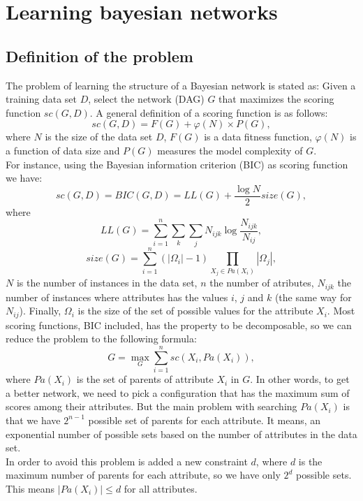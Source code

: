 \section{Learning bayesian networks}
\label{sec:learning}


\subsection{Definition of the problem}
\label{subsec:definition}

The problem of learning the structure of a Bayesian network is stated as: Given a training data set $D $, select the network (DAG) $G$ that maximizes the scoring function ${sc}( G , D )$.
A general definition of a scoring function is as follows:
	\[ {sc}( G , D ) = F( G ) + \varphi( N ) \times P( G ) ,\]
where $N$ is the size of the data set $D$, $F( G )$ is a data fitness function, $\varphi( N )$ is a function of data size and $P( G )$ measures the model complexity of $G$.\\
For instance, using the Bayesian information criterion (BIC) as scoring function we have:
	\[ {sc}( G , D ) = {BIC}( G , D ) = {LL}( G ) + \frac{\log N}{2} {size}( G ) ,\]
where
	\[ {LL}( G ) = \sum_{i=1}^{n} \sum_{k} \sum_{j} N_{ijk} \log \frac{N_{ijk}}{N_{ij}} ,\]
	\[ {size}( G ) = \sum_{i=1}^{n} ( |\Omega_i| - 1 ) \prod_{X_j \in {Pa}( X_i )} |\Omega_j| ,\]
$N$ is the number of instances in the data set, $n$ the number of atributes, $N_{ijk}$ the number of instances where attributes has the values $i$, $j$ and $k$ (the same way for $N_{ij}$). Finally, $\Omega_i$ is the size of the set of possible values for the attribute $X_i$.
Most scoring functions, BIC included, has the property to be decomposable, so we can reduce the problem to the following formula:
	\[ G = \max_G \sum_{i=1}^n {sc}( X_i , {Pa}( X_i ) ) , \]
where ${Pa}( X_i )$ is the set of parents of attribute $X_i$ in $G$.
In other words, to get a better network, we need to pick a configuration that has the maximum sum of scores among their attributes. But the main problem with searching ${Pa}( X_i)$ is that we have $2^{n-1}$ possible set of parents for each attribute. It means, an exponential number of possible sets based on the number of attributes in the data set.\\
In order to avoid this problem is added a new constraint $d$, where $d$ is the maximum number of parents for each attribute, so we have only $2^d$ possible sets. This means $|{Pa}( X_i )| \leq d$ for all attributes.

